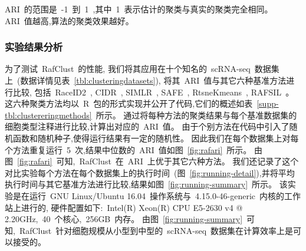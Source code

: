 ARI~的范围是~-1~到~1~,其中~1~表示估计的聚类与真实的聚类完全相同。
ARI~值越高,算法的聚类效果越好。

\subsubsection{实验结果分析}

为了测试~RafClust~的性能,
我们将其应用在十个知名的~scRNA-seq~数据集上~(数据详情见表~\ref{tbl:clusteringdatasets}),
将其~ARI~值与其它六种基准方法进行比较,
包括~RaceID2~\cite{grun2016novo}, CIDR~\cite{lin2017cidr}, SIMLR~\cite{wang2018simlr}, SAFE~\cite{yang2018safe}, RtsneKmeans~\cite{hartigan1979algorithm,maaten2008visualizing,van2014accelerating}, RAFSIL~\cite{pouyan2018random}。
这六种聚类方法均以~R~包的形式实现并公开了代码,它们的概述如表~\ref{supp-tbl:clustereringmethods}~所示。
通过将每种方法的聚类结果与每个基准数据集的细胞类型注释进行比较,计算出对应的~ARI~值。 
由于个别方法在代码中引入了随机函数和随机种子,使得运行结果有一定的随机性。
因此我们在每个数据集上对每个方法重复运行~5~次,结果中位数的~ARI~值如图~\ref{fig:rafari}~所示。
由图~\ref{fig:rafari}~可知,~RafClust~在~ARI~上优于其它六种方法。
我们还记录了这个对比实验每个方法在每个数据集上的执行时间~(图~\ref{fig:running-detail}),并将平均执行时间与其它基准方法进行比较,结果如图~\ref{fig:running-summary}~所示。
该实验是在运行~GNU Linux/Ubuntu 16.04~操作系统与~4.15.0-46-generic~内核的工作站上进行的,
硬件配置如下:~Intel(R) Xeon(R) CPU E5-2630 v4 @ 2.20GHz,~40~个核心,~256GB~内存。
由图~\ref{fig:running-summary}~可知,~RafClust~针对细胞规模从小型到中型的~scRNA-seq~数据集在计算效率上是可以接受的。

